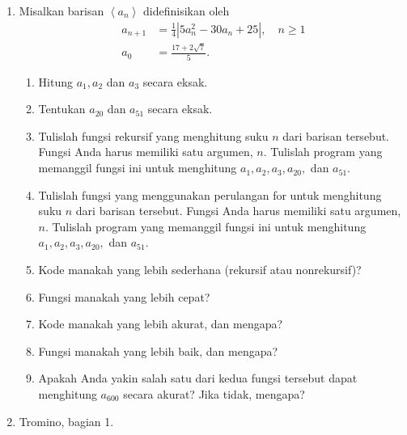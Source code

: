 \begin{enumerate}
\begin{enumerate}
\item \label{recursiveFib}Tulislah fungsi rekursif yang menghitung suku
$n$ dalam barisan Fibonacci. Fungsi Anda harus memiliki satu argumen,
$n$. 
\item \label{forloopFib}Tulislah fungsi yang menggunakan perulangan for
untuk menghitung suku $n$ dalam barisan Fibonacci. Fungsi Anda harus
memiliki satu argumen, $n$. 
\item Tulislah program yang memanggil fungsi dari \ref{recursiveFib} untuk
menghitung $F_{30}$.
\item Tulislah program yang memanggil fungsi dari \ref{forloopFib} untuk
menghitung $F_{30}$.
\item Kode manakah yang lebih sederhana (rekursif atau nonrekursif)?
\item Kode manakah yang lebih cepat?
\item Kode manakah yang lebih akurat?
\end{enumerate}
\textbf{CATATAN}: $F_{30}=1346269$.
\item \label{recursive2}Misalkan barisan $\left\langle a_{n}\right\rangle $
didefinisikan oleh 
\begin{align*}
a_{n+1} & =\frac{1}{4}\left|5a_{n}^{2}-30a_{n}+25\right|,\quad n\geq1\\
a_{0} & =\frac{17+2\sqrt{7}}{5}.
\end{align*}

\begin{enumerate}
\item Hitung $a_{1},a_{2}$ dan $a_{3}$ secara eksak.
\item Tentukan $a_{20}$ dan $a_{51}$ secara eksak.
\item Tulislah fungsi rekursif yang menghitung suku $n$ dari barisan tersebut.
Fungsi Anda harus memiliki satu argumen, $n$. Tulislah program yang
memanggil fungsi ini untuk menghitung $a_{1},a_{2},a_{3},a_{20},$
dan $a_{51}$.
\item Tulislah fungsi yang menggunakan perulangan for untuk menghitung suku
$n$ dari barisan tersebut. Fungsi Anda harus memiliki satu argumen,
$n$. Tulislah program yang memanggil fungsi ini untuk menghitung
$a_{1},a_{2},a_{3},a_{20},$ dan $a_{51}$.
\item Kode manakah yang lebih sederhana (rekursif atau nonrekursif)?
\item Fungsi manakah yang lebih cepat?
\item Kode manakah yang lebih akurat, dan mengapa?
\item Fungsi manakah yang lebih baik, dan mengapa?
\item Apakah Anda yakin salah satu dari kedua fungsi tersebut dapat menghitung
$a_{600}$ secara akurat? Jika tidak, mengapa?
\end{enumerate}
\item \label{exc:recursion}Tromino, bagian 1. \hasananswer 


\end{enumerate}
